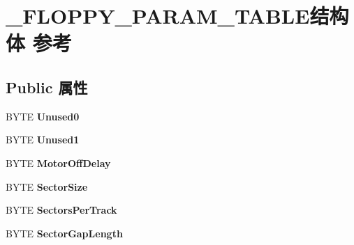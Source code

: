 \hypertarget{struct___f_l_o_p_p_y___p_a_r_a_m___t_a_b_l_e}{}\section{\+\_\+\+F\+L\+O\+P\+P\+Y\+\_\+\+P\+A\+R\+A\+M\+\_\+\+T\+A\+B\+L\+E结构体 参考}
\label{struct___f_l_o_p_p_y___p_a_r_a_m___t_a_b_l_e}
\subsection*{Public 属性}
\begin{DoxyCompactItemize}
\item 
\mbox{\label{struct___f_l_o_p_p_y___p_a_r_a_m___t_a_b_l_e_ad899066a244f9800b880f1670cacc0b4}} 
B\+Y\+TE {\bfseries Unused0}
\item 
\mbox{\label{struct___f_l_o_p_p_y___p_a_r_a_m___t_a_b_l_e_aa89799b23b206a6cdba9b6fdd61a1553}} 
B\+Y\+TE {\bfseries Unused1}
\item 
\mbox{\label{struct___f_l_o_p_p_y___p_a_r_a_m___t_a_b_l_e_a10da84f40810eaa10139a50a8be591c2}} 
B\+Y\+TE {\bfseries Motor\+Off\+Delay}
\item 
\mbox{\label{struct___f_l_o_p_p_y___p_a_r_a_m___t_a_b_l_e_ac553c8e6b699ab80132ae3cdd29fe4a3}} 
B\+Y\+TE {\bfseries Sector\+Size}
\item 
\mbox{\label{struct___f_l_o_p_p_y___p_a_r_a_m___t_a_b_l_e_a5f41338413225b77a568cff1f1270fa8}} 
B\+Y\+TE {\bfseries Sectors\+Per\+Track}
\item 
\mbox{\label{struct___f_l_o_p_p_y___p_a_r_a_m___t_a_b_l_e_af96ac1232e945c3013d8c38ff2186767}} 
B\+Y\+TE {\bfseries Sector\+Gap\+Length}
\item 
\mbox{\label{struct___f_l_o_p_p_y___p_a_r_a_m___t_a_b_l_e_a0cfc28afa4e3cb3fe995672ff1879fa6}} 

\end{DoxyCompactItemize}

